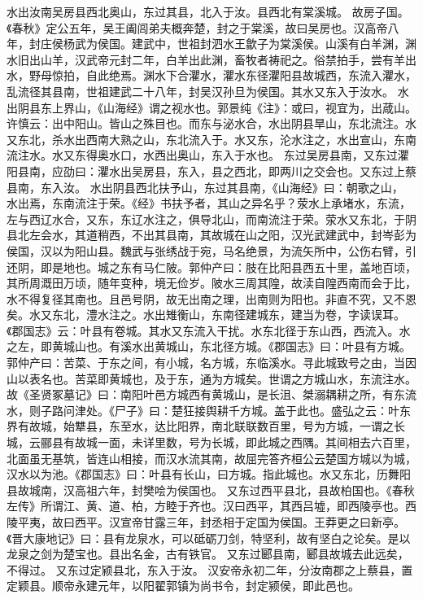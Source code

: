 \documentclass[12pt,UTF8]{ctexbook}
\begin{document}
水出汝南吴房县西北奥山，东过其县，北入于汝。县西北有棠溪城。
故房子国。《春秋》定公五年，吴王阖闾弟夫概奔楚，封之于棠溪，故曰吴房也。汉高帝八年，封庄侯杨武为侯国。建武中，世祖封泗水王歙子为棠溪侯。山溪有白羊渊，渊水旧出山羊，汉武帝元封二年，白羊出此渊，畜牧者祷祀之。俗禁拍手，尝有羊出水，野母惊拍，自此绝焉。渊水下合灈水，灈水东径灈阳县故城西，东流入灈水，乱流径其县南，世祖建武二十八年，封吴汉孙旦为侯国。其水又东入于汝水。
水出阴县东上界山，《山海经》谓之视水也。郭景纯《注》：或曰，视宜为，出葴山。许慎云：出中阳山。皆山之殊目也。而东与泌水合，水出阴县旱山，东北流注。水又东北，杀水出西南大熟之山，东北流入于。水又东，沦水注之，水出宣山，东南流注水。水又东得奥水口，水西出奥山，东入于水也。
东过吴房县南，又东过灈阳县南，应劭曰：灈水出吴房县，东入，县之西北，即两川之交会也。又东过上蔡县南，东入汝。
水出阴县西北扶予山，东过其县南，《山海经》曰：朝歌之山， 水出焉，东南流注于荣。《经》书扶予者，其山之异名乎？荥水上承堵水，东流，左与西辽水合，又东，东辽水注之，俱导北山，而南流注于荣。荥水又东北，于阴县北左会水，其道稍西，不出其县南，其故城在山之阳，汉光武建武中，封岑彭为侯国，汉以为阳山县。魏武与张绣战于宛，马名绝景，为流矢所中，公伤右臂，引还阴，即是地也。城之东有马仁陂。郭仲产曰：肢在比阳县西五十里，盖地百顷，其所周溉田万顷，随年变种，境无俭岁。陂水三周其隍，故渎自隍西南而会于比， 水不得复径其南也。且邑号阴，故无出南之理，出南则为阳也。非直不究，又不恩矣。水又东北，澧水注之。水出雉衡山，东南径建城东，建当为卷，字读误耳。《郡国志》云：叶县有卷城。其水又东流入干扰。水东北径于东山西，西流入。水之左，即黄城山也。有溪水出黄城山，东北径方城。《郡国志》曰：叶县有方城。郭仲产曰：苦菜、于东之间，有小城，名方城，东临溪水。寻此城致号之由，当因山以表名也。苦菜即黄城也，及于东，通为方城矣。世谓之方城山水，东流注水。故《圣贤冢墓记》曰：南阳叶邑方城西有黄城山，是长沮、桀溺耦耕之所，有东流水，则子路问津处。《尸子》曰：楚狂接舆耕千方城。盖于此也。盛弘之云：叶东界有故城，始犨县，东至水，达比阳界，南北联联数百里，号为方城，一谓之长城，云郦县有故城一面，未详里数，号为长城，即此城之西隅。其间相去六百里，北面虽无基筑，皆连山相接，而汉水流其南，故屈完答齐桓公云楚国方城以为城，汉水以为池。《郡国志》曰：叶县有长山，曰方城。指此城也。水又东北，历舞阳县故城南，汉高祖六年，封樊哙为侯国也。
又东过西平县北，县故柏国也。《春秋左传》所谓江、黄、道、柏，方睦于齐也。汉曰西平，其西吕墟，即西陵亭也。西陵平夷，故曰西平。汉宣帝甘露三年，封丞相于定国为侯国。王莽更之曰新亭。《晋大康地记》曰：县有龙泉水，可以砥砺刀剑，特坚利，故有坚白之论矣。是以龙泉之剑为楚宝也。县出名金，古有铁官。
又东过郾县南，郾县故城去此远矣，不得过。
又东过定颍县北，东入于汝。
汉安帝永初二年，分汝南郡之上蔡县，置定颖县。顺帝永建元年，以阳翟郭镇为尚书令，封定颍侯，即此邑也。
\end{document}
